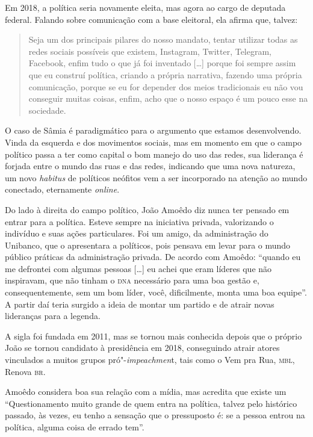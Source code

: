 Em 2018, a política seria novamente eleita, mas agora ao cargo de
deputada federal. Falando sobre comunicação com a base eleitoral, ela
afirma que, talvez:

\begin{quote}
Seja um dos principais pilares do nosso mandato, tentar utilizar todas
as redes sociais possíveis que existem, Instagram, Twitter, Telegram,
Facebook, enfim tudo o que já foi inventado {[}\ldots{}{]} porque foi sempre
assim que eu construí política, criando a própria narrativa, fazendo uma
própria comunicação, porque se eu for depender dos meios tradicionais eu
não vou conseguir muitas coisas, enfim, acho que o nosso espaço é um
pouco esse na sociedade.
\end{quote}

O caso de Sâmia é paradigmático para o argumento que estamos
desenvolvendo. Vinda da esquerda e dos movimentos sociais, mas em
momento em que o campo político passa a ter como capital o bom manejo do
uso das redes, sua liderança é forjada entre o mundo das ruas e das
redes, indicando que uma nova natureza, um novo \emph{habitus} de
políticos neófitos vem a ser incorporado na atenção ao mundo conectado,
eternamente \emph{\emph{online}}.

Do lado à direita do campo político, João Amoêdo diz nunca ter pensado
em entrar para a política. Esteve sempre na iniciativa privada,
valorizando o indivíduo e suas ações particulares. Foi um amigo, da
administração do Unibanco, que o apresentara a políticos, pois pensava
em levar para o mundo público práticas da administração privada. De
acordo com Amoêdo: ``quando eu me defrontei com algumas pessoas
{[}\ldots{}{]} eu achei que eram líderes que não inspiravam, que não tinham o
\textsc{dna} necessário para uma boa gestão e, consequentemente, sem um bom
líder, você, dificilmente, monta uma boa equipe''. A partir daí teria
surgido a ideia de montar um partido e de atrair novas lideranças para a
legenda.

A sigla foi fundada em 2011, mas se tornou mais conhecida depois que o
próprio João se tornou candidato à presidência em 2018, conseguindo
atrair atores vinculados a muitos grupos pró"-\emph{impeachmen}t, tais
como o Vem pra Rua, \textsc{mbl}, Renova \textsc{br}.

Amoêdo considera boa sua relação com a mídia, mas acredita que existe um
``Questionamento muito grande de quem entra na política, talvez pelo
histórico passado, às vezes, eu tenho a sensação que o pressuposto é: se
a pessoa entrou na política, alguma coisa de errado tem''.

